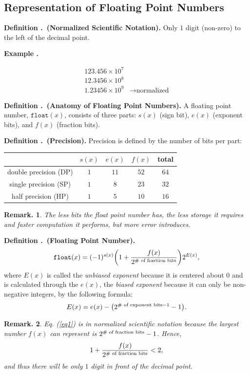 \documentclass[12pt, a4paper]{article}
\newcounter{index}[subsection]
\newenvironment*{df}[1]{\par\noindent\textbf{Definition \thesubsection.\stepcounter{index}\theindex\ (#1).}}{\par}
\newenvironment*{eg}[1]{\begin{framed}\par\noindent\textbf{Example \thesubsection.\stepcounter{index}\theindex\ #1} \par}{\par\end{framed}}
\newtheorem{rmk}{Remark.}[section]
\begin{document}
\subsection{Representation of Floating Point Numbers}
\begin{df}{Normalized Scientific Notation}
	Only $1$ digit (non-zero) to the left of the decimal point.	
\end{df}
\begin{eg}{}
	\[\begin{aligned}123.456\times10^7&\\12.3456\times10^8&\\1.23456\times10^9&\rightarrow\text{normalized}\end{aligned}\]	
\end{eg}
\begin{df}{Anatomy of Floating Point Numbers}
	A floating point number, $\texttt{float}(x)$, consists of three parts: $s(x)$ (sign bit), $e(x)$ (exponent bits), and $f(x)$ (fraction bits).
\end{df}
\begin{df}{Precision}
	Precision is defined by the number 	of bits per part:
	\begin{center}\begin{tabular}{c|c|c|c|c}
	&$s(x)$&$e(x)$&$f(x)$&total\\\hline
	double precision (DP)&$1$&$11$&$52$&$64$\\
	single precision (SP)&$1$&$8$&$23$&$32$\\
	half precision (HP)&$1$&$5$&$10$&$16$\\
	\end{tabular}\end{center}
	\begin{rmk}The less bits the float point number has, the less storage it requires and faster computation it performs, but more error introduces.\end{rmk}
\end{df}
\begin{df}{Floating Point Number}
	\begin{equation}\label{eq1}\texttt{float}(x)=(-1)^{s(x)}\qty(1+\dfrac{f(x)}{2^\text{\# of fraction bits}})2^{E(x)},\end{equation} where $E(x)$ is called the \textit{unbiased exponent} because it is centered about $0$ and is calculated through the $e(x)$, the \textit{biased exponent} because it can only be non-negative integers, by the following formula: \[E(x)=e(x)-\qty(2^{\text{\# of exponent bits}-1}-1).\]	
	\begin{rmk}
		Eq. (\ref{eq1}) is in normalized scientific notation because the largest number $f(x)$ can represent is $2^\textnormal{\# of fraction bits}-1$. Hence, \[1+\dfrac{f(x)}{2^\textnormal{\# of fraction bits}}<2,\] and thus there will be only $1$ digit in front of the decimal point.
	\end{rmk}
\end{df}
\end{document}
